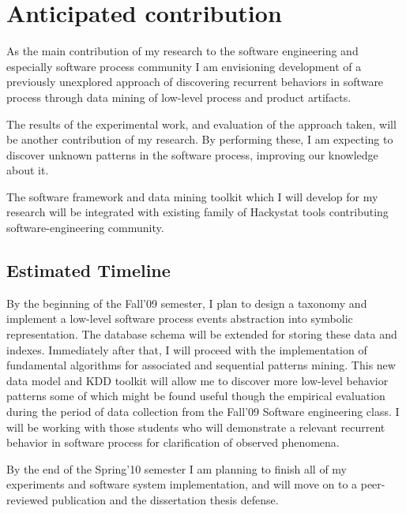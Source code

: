 \chapter{Anticipated contribution} \label{contribution}
As the main contribution of my research to the software engineering and especially software process community I am envisioning development of a previously unexplored approach of discovering recurrent behaviors in software process through data mining of low-level process and product artifacts.

The results of the experimental work, and evaluation of the approach taken, will be another contribution of my research. By performing these, I am expecting to discover unknown patterns in the software process, improving our knowledge about it.

The software framework and data mining toolkit which I will develop for my research will be integrated with existing family of Hackystat tools contributing software-engineering community.

\section{Estimated Timeline}
By the beginning of the Fall'09 semester, I plan to design a taxonomy and implement a low-level software process events abstraction into symbolic representation. The database schema will be extended for storing these data and indexes. Immediately after that, I will proceed with the implementation of fundamental algorithms for associated and sequential patterns mining. This new data model and KDD toolkit will allow me to discover more low-level behavior patterns some of which might be found useful though the empirical evaluation during the period of data collection from the Fall'09 Software engineering class. I will be working with those students who will demonstrate a relevant recurrent behavior in software process for clarification of observed phenomena.

By the end of the Spring'10 semester I am planning to finish all of my experiments and software system implementation, and will move on to a peer-reviewed publication and the dissertation thesis defense.
